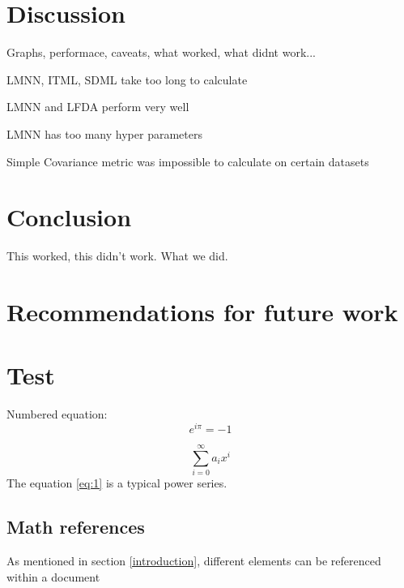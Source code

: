 \documentclass[12pt,a4paper]{report}
\begin{document}

\chapter{Discussion}

Graphs, performace, caveats, what worked, what didnt work...

LMNN, ITML, SDML take too long to calculate

LMNN and LFDA perform very well

LMNN has too many hyper parameters

Simple Covariance metric was impossible to calculate on certain datasets


\chapter*{Conclusion}

This worked, this didn't work. What we did.

\chapter*{Recommendations for future work}


\chapter*{Test} \label{subsection}


\noindent Numbered equation:
\begin{equation*}\label{my favorite equation}
  e^{i\pi}=-1
\end{equation*}

\begin{equation} \label{eq:1}
\sum_{i=0}^{\infty} a_i x^i
\end{equation} 
The equation \ref{eq:1} is a typical power series.


\section{Math references} \label{mathrefs}
As mentioned in section \autoref{introduction}, different elements can 
be referenced within a document
\end{document}
